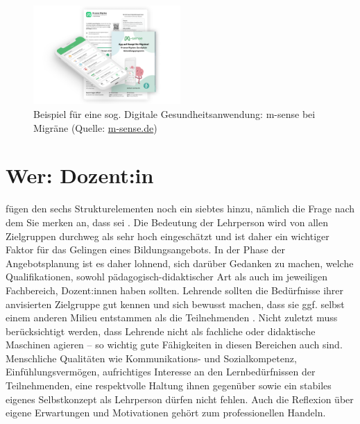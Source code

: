 \documentclass[
  twoside,
  parskip=half-,
  paper=176mm:246mm,
  BCOR=14mm,
  DIV=14,
]{scrreprt}
\begin{document}
\begin{figure}
  \centering
  \includegraphics[width=0.5\textwidth]{Grafiken/Infopaket_M-sense_Migraene-2.png}
  \caption{Beispiel für eine sog. Digitale Gesundheitsanwendung: m-sense bei Migräne (Quelle: \url{m-sense.de})}
  \label{fig:msense}
\end{figure}

\section{Wer: Dozent:in}\label{sec:wer}
\citeauthor{reich-claassen} fügen den sechs Strukturelementen noch ein siebtes hinzu, nämlich die Frage nach dem  Sie merken an, dass  sei \autocite[1010]{reich-claassen}. Die Bedeutung der Lehrperson wird von allen Zielgruppen durchweg als sehr hoch eingeschätzt und ist daher ein wichtiger Faktor für das Gelingen eines Bildungsangebots. In der Phase der Angebotsplanung ist es daher lohnend, sich darüber Gedanken zu machen, welche Qualifikationen, sowohl pädagogisch-didaktischer Art als auch im jeweiligen Fachbereich, Dozent:innen haben sollten. Lehrende sollten die Bedürfnisse ihrer anvisierten Zielgruppe gut kennen und sich bewusst machen, dass sie ggf. selbst einem anderen Milieu entstammen als die Teilnehmenden \autocite[vgl.][1011]{reich-claassen}. Nicht zuletzt muss berücksichtigt werden, dass Lehrende nicht als fachliche oder didaktische Maschinen agieren -- so wichtig gute Fähigkeiten in diesen Bereichen auch sind. Menschliche Qualitäten wie Kommunikations- und Sozialkompetenz, Einfühlungsvermögen, aufrichtiges Interesse an den Lernbedürfnissen der Teilnehmenden, eine respektvolle Haltung ihnen gegenüber sowie ein stabiles eigenes Selbstkonzept als Lehrperson dürfen nicht fehlen. Auch die Reflexion über eigene Erwartungen und Motivationen gehört zum professionellen Handeln.
\end{document}

